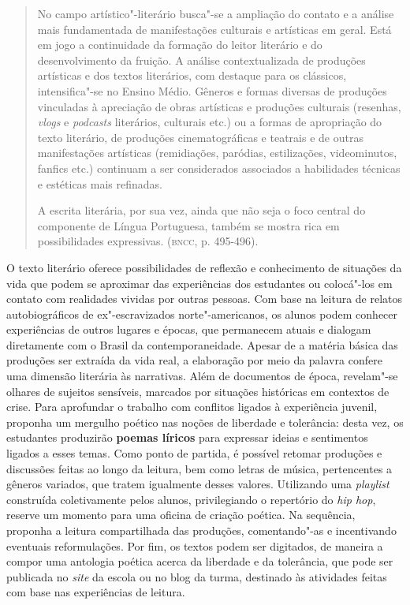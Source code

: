 \documentclass[11pt]{extarticle}
\begin{document}
\begin{enumerate}
\begin{enumerate}
\begin{enumerate}
\begin{quote}
No campo artístico"-literário busca"-se a ampliação do contato e a
análise mais fundamentada de manifestações culturais e artísticas em
geral. Está em jogo a continuidade da formação do leitor literário e do
desenvolvimento da fruição. A análise contextualizada de produções
artísticas e dos textos literários, com destaque para os clássicos,
intensifica"-se no Ensino Médio. Gêneros e formas diversas de produções
vinculadas à apreciação de obras artísticas e produções culturais
(resenhas, \emph{vlogs} e \emph{podcasts} literários, culturais etc.) ou a formas de
apropriação do texto literário, de produções cinematográficas e teatrais
e de outras manifestações artísticas (remidiações, paródias,
estilizações, videominutos, fanfics etc.) continuam a ser considerados
associados a habilidades técnicas e estéticas mais refinadas.

A escrita literária, por sua vez, ainda que não seja o foco central do
componente de Língua Portuguesa, também se mostra rica em possibilidades
expressivas. (\textsc{bncc}, p. 495-496).
\end{quote}

  O texto literário oferece possibilidades de reflexão e conhecimento de
  situações da vida que podem se aproximar das experiências dos
  estudantes ou colocá"-los em contato com realidades vividas por outras
  pessoas. Com base na leitura de relatos autobiográficos de
  ex"-escravizados norte"-americanos, os alunos podem conhecer
  experiências de outros lugares e épocas, que permanecem atuais e
  dialogam diretamente com o Brasil da contemporaneidade. Apesar de a
  matéria básica das produções ser extraída da vida real, a elaboração
  por meio da palavra confere uma dimensão literária às narrativas. Além
  de documentos de época, revelam"-se olhares de sujeitos sensíveis,
  marcados por situações históricas em contextos de crise. Para
  aprofundar o trabalho com conflitos ligados à experiência juvenil,
  proponha um mergulho poético nas noções de liberdade e tolerância:
  desta vez, os estudantes produzirão \textbf{poemas líricos} para
  expressar ideias e sentimentos ligados a esses temas. Como ponto de
  partida, é possível retomar produções e discussões feitas ao longo da
  leitura, bem como letras de música, pertencentes a gêneros variados,
  que tratem igualmente desses valores. Utilizando uma \emph{playlist}
  construída coletivamente pelos alunos, privilegiando o repertório do
  \emph{hip hop}, reserve um momento para uma oficina de criação
  poética. Na sequência, proponha a leitura compartilhada das produções,
  comentando"-as e incentivando eventuais reformulações. Por fim, os
  textos podem ser digitados, de maneira a compor uma antologia poética
  acerca da liberdade e da tolerância, que pode ser publicada no
  \emph{site} da escola ou no blog da turma, destinado às atividades
  feitas com base nas experiências de leitura.


\end{enumerate}
\end{enumerate}
\end{enumerate}
\end{document}
